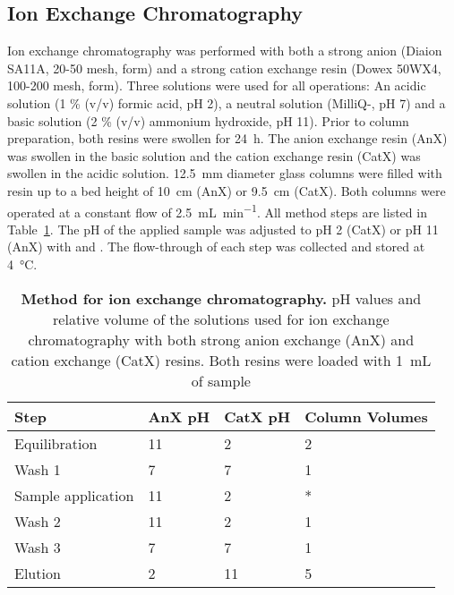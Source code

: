 	\subsection{Ion Exchange Chromatography} %
	\label{sub:ion_exchange_chromatography}

	Ion exchange chromatography was performed with both a strong anion (Diaion SA11A, 20-50 mesh,  form) and a strong cation exchange resin (Dowex 50WX4, 100-200 mesh,  form). Three solutions were used for all operations: An acidic solution (1 \% (v/v) formic acid, pH 2), a neutral solution (MilliQ-, pH 7) and a basic solution (2 \% (v/v) ammonium hydroxide, pH 11).
	Prior to column preparation, both resins were swollen for \SI{24}{\hour}. The anion exchange resin (AnX) was swollen in the basic solution and the cation exchange resin (CatX) was swollen in the acidic solution. \SI{12.5}{\milli\meter} diameter glass columns were filled with resin up to a bed height of \SI{10}{\centi\meter} (AnX) or \SI{9.5}{\centi\meter} (CatX).
	Both columns were operated at a constant flow of \SI{2.5}{\milli\liter\per\minute}. All method steps are listed in Table~\ref{tab:ion_exchange_tab}. The pH of the applied sample was adjusted to pH 2 (CatX) or pH 11 (AnX) with  and . The flow-through of each step was collected and stored at \SI{4}{\celsius}.

	\begin{table}[htbp]
		\caption[Method for ion exchange chromatography]{\textbf{Method for ion exchange chromatography.} pH values and relative volume of the solutions used for ion exchange chromatography with both strong anion exchange (AnX) and cation exchange (CatX) resins. Both resins were loaded with \SI{1}{\milli\liter} of sample}
		\label{tab:ion_exchange_tab}
		\centering
		\begin{tabularx}{\textwidth}{XXXX}
			\toprule
			\textbf{Step} 			& \textbf{AnX pH}	& \textbf{CatX pH} 	& \textbf{Column Volumes} 	\\
			\midrule
			Equilibration 	 		& 11 				& 2 				& 2		\\
			Wash 1 					& 7 				& 7 				& 1 	\\
			Sample application 		& 11 				& 2 				& *		\\
			Wash 2  				& 11 				& 2 				& 1 	\\
			Wash 3 					& 7					& 7 				& 1 	\\
			Elution 				& 2 				& 11 				& 5 	\\
			\bottomrule
		\end{tabularx}
	\end{table}


